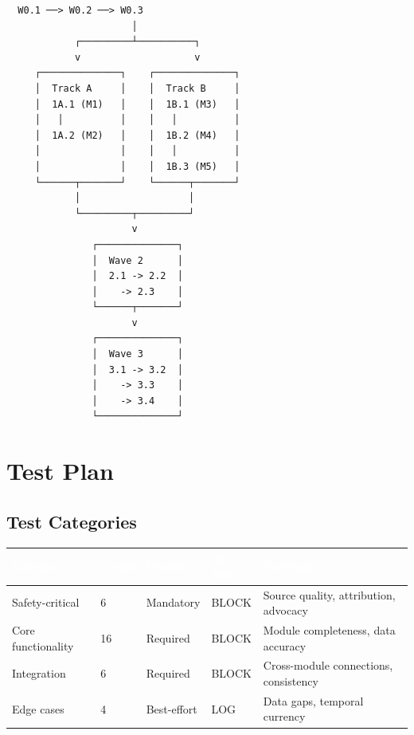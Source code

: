 \documentclass[11pt,letterpaper]{article}
\newcommand{\tableheader}[1]{\textbf{\sffamily\textcolor{white}{#1}}}
\begin{document}
\begin{asciibox}
\begin{verbatim}
  W0.1 ──> W0.2 ──> W0.3
                      │
            ┌─────────┴──────────┐
            v                    v
     ┌──────────────┐    ┌──────────────┐
     │  Track A     │    │  Track B     │
     │  1A.1 (M1)   │    │  1B.1 (M3)   │
     │   │          │    │   │          │
     │  1A.2 (M2)   │    │  1B.2 (M4)   │
     │              │    │   │          │
     │              │    │  1B.3 (M5)   │
     └──────┬───────┘    └──────┬───────┘
            │                   │
            └─────────┬─────────┘
                      v
               ┌──────────────┐
               │  Wave 2      │
               │  2.1 -> 2.2  │
               │    -> 2.3    │
               └──────┬───────┘
                      v
               ┌──────────────┐
               │  Wave 3      │
               │  3.1 -> 3.2  │
               │    -> 3.3    │
               │    -> 3.4    │
               └──────────────┘
\end{verbatim}
\end{asciibox}

\section{Test Plan}

\subsection{Test Categories}

\begin{center}
\begin{tabularx}{\textwidth}{L{3cm}C{1.2cm}C{1.5cm}C{1.5cm}X}
\toprule
{}
\tableheader{Category} & \tableheader{Count} & \tableheader{Priority} & \tableheader{On Fail} & \tableheader{Coverage} \\
\midrule
Safety-critical & 6 & Mandatory & BLOCK & Source quality, attribution, advocacy \\
Core functionality & 16 & Required & BLOCK & Module completeness, data accuracy \\
Integration & 6 & Required & BLOCK & Cross-module connections, consistency \\
Edge cases & 4 & Best-effort & LOG & Data gaps, temporal currency \\
\bottomrule
\end{tabularx}
\end{center}
\end{document}

